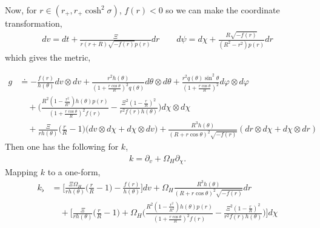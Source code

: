 \documentclass[11pt]{article}
\renewcommand{\phi}{\varphi}
\begin{document}
 Now, for $r\in (r_+,r_+\cosh^2\sigma)$, $f(r)<0$ so we can make the coordinate transformation, 
\begin{align}
dv=dt+\frac{\Xi}{r(r+R)\sqrt{-f(r)}p(r)}dr\qquad d\psi=d\chi+\frac{R\sqrt{-f(r)}}{(R^2-r^2)p(r)}dr
\end{align}
which gives the metric, 
\iffalse
\begin{align}
g=\begin{pmatrix}
 -\frac{f(r)}{h(\theta)}&0&0&0&\frac{\Xi}{rh(\theta)}\Big(\frac{r}{R}-1\Big)\\
 0&0&0&0&\frac{R^3h(\theta)}{(R+r\cos\theta)^2\sqrt{-f(r)}}\\
 0&0&\frac{r^2h(\theta)}{(1+\frac{r\cos\theta}{R})^2q(\theta)}&0&0\\
 0&0&0&\frac{r^2q(\theta)\sin^2\theta}{(1+\frac{r\cos\theta}{R})^2}&0\\
\frac{\Xi}{rh(\theta)}\Big(\frac{r}{R}-1\Big) &\frac{R^3h(\theta)}{(R+r\cos\theta)^2\sqrt{-f(r)}}&0&0&\frac{R^2(1-\frac{r^2}{R^2})h(\theta)p(r)}{(1+\frac{r\cos\theta}{R})^2f(r)}-\frac{\Xi^2(1-\frac{r}{R})^2}{r^2f(r)h(\theta)}
 \end{pmatrix}
\end{align}
\fi
\begin{align}
 g&\doteq-\frac{f(r)}{h(\theta)}dv\otimes dv+\frac{r^2h(\theta)}{(1+\frac{r\cos\theta}{R})^2q(\theta)}d\theta\otimes d\theta+\frac{r^2q(\theta)\sin^2\theta}{(1+\frac{r\cos\theta}{R})^2}d\phi\otimes d\phi\\
 &\nonumber\quad+\Big(\frac{R^2(1-\frac{r^2}{R^2})h(\theta)p(r)}{(1+\frac{r\cos\theta}{R})^2f(r)}-\frac{\Xi^2(1-\frac{r}{R})^2}{r^2f(r)h(\theta)}\Big)d\chi\otimes d\chi\nonumber\\
 &\nonumber\quad+\frac{\Xi}{rh(\theta)}\Big(\frac{r}{R}-1\Big)\big(dv\otimes d\chi+d\chi\otimes dv\big)+\frac{R^3h(\theta)}{(R+r\cos\theta)^2\sqrt{-f(r)}}(dr\otimes d\chi+d\chi\otimes dr)\nonumber
 \end{align}
Then one has the following for $k$, 
\begin{align}
k=\partial_v+\Omega_H\partial_{\chi}.
\end{align}
Mapping $k$ to a one-form, 
\begin{align}
k_{\flat}&=\Big[\frac{\Xi\Omega_H}{rh(\theta)}\Big(\frac{r}{R}-1\Big)-\frac{f(r)}{h(\theta)}\Big]dv+\Omega_H\frac{R^3h(\theta)}{(R+r\cos\theta)^2\sqrt{-f(r)}}dr\\
&\nonumber\quad+\Big[\frac{\Xi}{rh(\theta)}\Big(\frac{r}{R}-1\Big)+\Omega_H\Big(\frac{R^2(1-\frac{r^2}{R^2})h(\theta)p(r)}{(1+\frac{r\cos\theta}{R})^2f(r)}-\frac{\Xi^2(1-\frac{r}{R})^2}{r^2f(r)h(\theta)}\Big)\Big]d\chi
\end{align}
\end{document}
